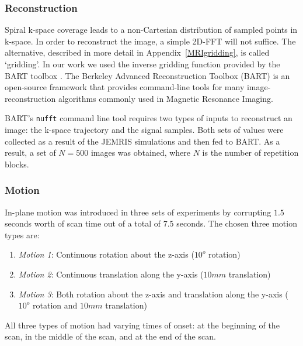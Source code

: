 \subsubsection{Reconstruction}

Spiral k-space coverage leads to a non-Cartesian distribution of sampled points in k-space.
In order to reconstruct the image, a simple 2D-FFT will not suffice.
The alternative, described in more detail in Appendix~\ref{MRIgridding}, is called `gridding'.
In our work we used the inverse gridding function provided by the BART toolbox \cite{Lustig2016}.
The Berkeley Advanced Reconstruction Toolbox (BART) is an open-source framework that provides command-line tools for many image-reconstruction algorithms commonly used in Magnetic Resonance Imaging.

\hfill

BART's \texttt{nufft} command line tool requires two types of inputs to reconstruct an image: the k-space trajectory and the signal samples.
Both sets of values were collected as a result of the JEMRIS simulations and then fed to BART.
As a result, a set of $N = 500$ images was obtained, where $N$ is the number of repetition blocks.

\hfill

\subsubsection{Motion}
\label{method:motion}

In-plane motion was introduced in three sets of experiments by corrupting $1.5$ seconds worth of scan time out of a total of $7.5$ seconds.
The chosen three motion types are:
\begin{enumerate}
    \item \textit{Motion 1}: Continuous rotation about the z-axis ($10^o$ rotation)
    \item \textit{Motion 2}: Continuous translation along the y-axis ($10mm$ translation)
    \item \textit{Motion 3}: Both rotation about the z-axis and translation along the y-axis ($10^o$ rotation and $10mm$ translation)
\end{enumerate}

All three types of motion had varying times of onset: at the beginning of the scan, in the middle of the scan, and at the end of the scan.



